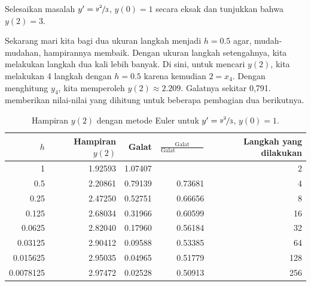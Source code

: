 \begin{exercise}
Selesaikan masalah
$y' = \nicefrac{y^2}{3}$, $y(0)=1$
secara eksak dan tunjukkan bahwa $y(2) = 3$.
\end{exercise}

Sekarang mari kita bagi dua ukuran langkah menjadi $h=0.5$ agar, mudah-mudahan, hampirannya membaik.
Dengan ukuran langkah setengahnya, kita melakukan langkah dua kali lebih banyak.
Di sini, untuk mencari $y(2)$, kita melakukan 4 langkah dengan $h=0.5$ karena kemudian $2 = x_4$.
Dengan menghitung $y_4$,
kita memperoleh $y(2) \approx 2.209$.  Galatnya sekitar 0,791.
 memberikan nilai-nilai yang dihitung
untuk beberapa pembagian dua berikutnya.

\begin{table}[h!t]
\mybeginframe
\capstart
\begin{center}
\begin{tabular}{@{}rrrrr@{}}
\toprule
$h$ & Hampiran $y(2)$ & Galat & $\frac{\text{Galat}}{\text{Galat
sebelumnya}}$ & Langkah yang dilakukan \\
\midrule
1        & 1.92593 & 1.07407 &         & 2 \\
0.5      & 2.20861 & 0.79139 & 0.73681 & 4 \\
0.25     & 2.47250 & 0.52751 & 0.66656 & 8 \\
0.125    & 2.68034 & 0.31966 & 0.60599 & 16 \\
0.0625   & 2.82040 & 0.17960 & 0.56184 & 32 \\
0.03125  & 2.90412 & 0.09588 & 0.53385 & 64 \\
0.015625 & 2.95035 & 0.04965 & 0.51779 & 128 \\
0.0078125& 2.97472 & 0.02528 & 0.50913 & 256 \\
\bottomrule
\end{tabular}
\end{center}
\caption{Hampiran $y(2)$ dengan metode Euler untuk
$y'=\nicefrac{y^2}{3}$, $y(0)=1$.\label{euler-table:table}}
\myendframe
\end{table}

